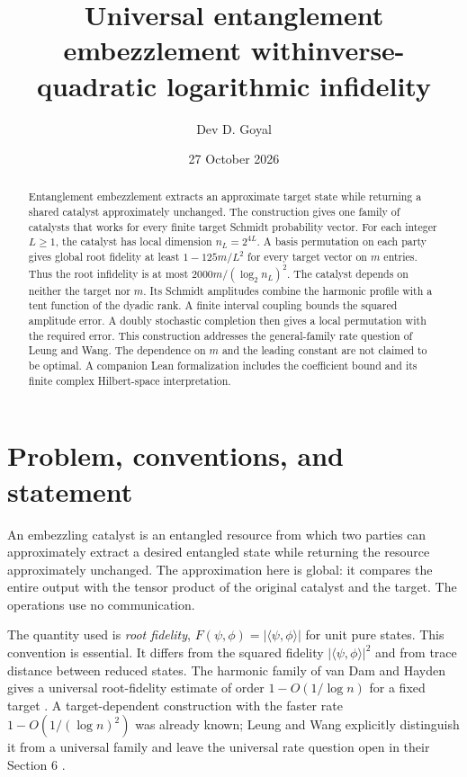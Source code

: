 \documentclass[11pt]{article}
\title{Universal entanglement embezzlement with\newline inverse-quadratic logarithmic infidelity}
\author{Dev D. Goyal}
\date{27 October 2026}
\begin{document}
\maketitle

\par{}
\begin{abstract}
Entanglement embezzlement extracts an approximate target state while returning a shared catalyst approximately unchanged. The construction gives one family of catalysts that works for every finite target Schmidt probability vector. For each integer $L\geq1$, the catalyst has local dimension $n_L=2^{4L}$. A basis permutation on each party gives global root fidelity at least $1-125m/L^2$ for every target vector on $m$ entries. Thus the root infidelity is at most $2000m/(\log_2 n_L)^2$. The catalyst depends on neither the target nor $m$. Its Schmidt amplitudes combine the harmonic profile with a tent function of the dyadic rank. A finite interval coupling bounds the squared amplitude error. A doubly stochastic completion then gives a local permutation with the required error. This construction addresses the general-family rate question of Leung and Wang. The dependence on $m$ and the leading constant are not claimed to be optimal. A companion Lean formalization includes the coefficient bound and its finite complex Hilbert-space interpretation.
\end{abstract}

\section{Problem, conventions, and statement}

An embezzling catalyst is an entangled resource from which two parties can approximately extract a desired entangled state while returning the resource approximately unchanged. The approximation here is global: it compares the entire output with the tensor product of the original catalyst and the target. The operations use no communication.

The quantity used is \emph{root fidelity}, $F(\psi,\phi)=|\langle\psi,\phi\rangle|$ for unit pure states. This convention is essential. It differs from the squared fidelity $|\langle\psi,\phi\rangle|^2$ and from trace distance between reduced states. The harmonic family of van Dam and Hayden gives a universal root-fidelity estimate of order $1-O(1/\log n)$ for a fixed target \cite{vdh}. A target-dependent construction with the faster rate $1-O(1/(\log n)^2)$ was already known; Leung and Wang explicitly distinguish it from a universal family and leave the universal rate question open in their Section 6 \cite{lw,ltw}.
\end{document}
